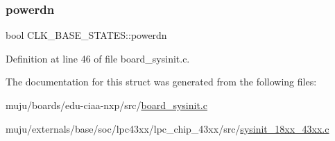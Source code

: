 \subsubsection{\texorpdfstring{powerdn}{powerdn}}
{\footnotesize\ttfamily bool C\+L\+K\+\_\+\+B\+A\+S\+E\+\_\+\+S\+T\+A\+T\+E\+S\+::powerdn}



Definition at line 46 of file board\+\_\+sysinit.\+c.



The documentation for this struct was generated from the following files\+:\begin{DoxyCompactItemize}
\item 
muju/boards/edu-\/ciaa-\/nxp/src/\hyperlink{board__sysinit_8c}{board\+\_\+sysinit.\+c}\item 
muju/externals/base/soc/lpc43xx/lpc\+\_\+chip\+\_\+43xx/src/\hyperlink{sysinit__18xx__43xx_8c}{sysinit\+\_\+18xx\+\_\+43xx.\+c}\end{DoxyCompactItemize}
